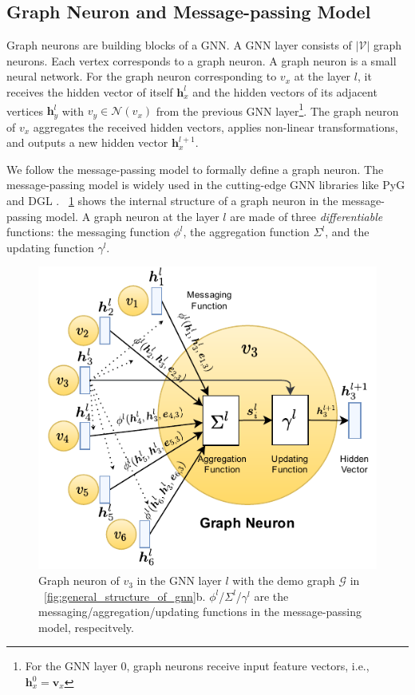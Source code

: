 \subsection{Graph Neuron and Message-passing Model}

Graph neurons are building blocks of a GNN.
%
A GNN layer consists of $|\mathcal{V}|$ graph neurons.
%
Each vertex corresponds to a graph neuron.
%
A graph neuron is a small neural network.
%
For the graph neuron corresponding to $v_x$ at the layer $l$, it receives the hidden vector of itself $\boldsymbol{h}^l_x$ and the hidden vectors of its adjacent vertices $\boldsymbol{h}^l_y$ with $v_y \in \mathcal{N}(v_x)$ from the previous GNN layer\footnote{For the GNN layer 0, graph neurons receive input feature vectors, i.e., $\boldsymbol{h}^0_x=\boldsymbol{v}_x$}.
%
The graph neuron of $v_x$ aggregates the received hidden vectors, applies non-linear transformations, and outputs a new hidden vector $\boldsymbol{h}_x^{l+1}$.

We follow the message-passing model \cite{gilmer_messgae_passing} to formally define a graph neuron.
%
The message-passing model is widely used in the cutting-edge GNN libraries like PyG \cite{PyG} and DGL \cite{DGL}.
%
\figurename~\ref{fig:graph_neuron_structure} shows the internal structure of a graph neuron in the message-passing model.
%
A graph neuron at the layer $l$ are made of three \emph{differentiable} functions: the messaging function $\phi^l$, the aggregation function $\Sigma^l$, and the updating function $\gamma^l$.

\begin{figure}[H]
    \centering
    \includegraphics[width=0.5\columnwidth]{figs/illustration/GNN_Unit.pdf}
    \caption{Graph neuron of $v_3$ in the GNN layer $l$ with the demo graph $\mathcal{G}$ in \figurename~\ref{fig:general_structure_of_gnn}b. $\phi^l$/$\Sigma^l$/$\gamma^l$ are the messaging/aggregation/updating functions in the message-passing model, respecitvely.}
    \label{fig:graph_neuron_structure}
\end{figure}

